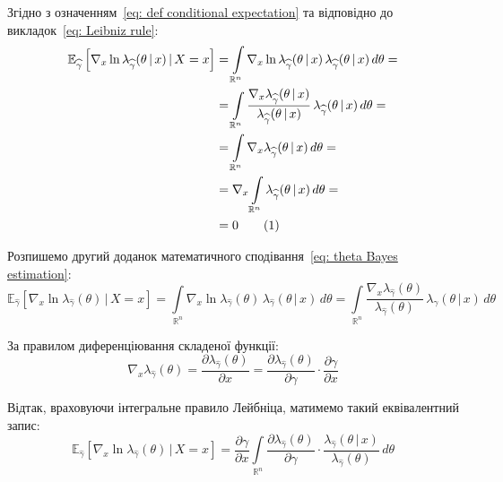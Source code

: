 \documentclass{mathreport}
\begin{document}
Згідно з означенням~\eqref{eq: def conditional expectation} та відповідно до викладок~\eqref{eq: Leibniz rule}:
\begin{align*}\label{eq: duplicated Leibniz rule}
    \mathbb{E}_{\widehat{\gamma}} \left[ \nabla_x\ln{\lambda_{\widehat{\gamma}}(\theta \,|\, x)} \,|\, X=x \right] & = \int\limits_{\mathbb{R}^n} \nabla_x\ln{\lambda_{\widehat{\gamma}}(\theta \,|\, x)} \, \lambda_{\widehat{\gamma}}(\theta \,|\, x) \, d\theta = \\
    & = \int\limits_{\mathbb{R}^n} \frac{\nabla_x\lambda_{\widehat{\gamma}}(\theta \,|\, x)}{\lambda_{\widehat{\gamma}}(\theta \,|\, x)} \, \lambda_{\widehat{\gamma}}(\theta \,|\, x) \, d\theta = \\
    & = \int\limits_{\mathbb{R}^n} \nabla_x\lambda_{\widehat{\gamma}}(\theta \,|\, x) \, d\theta = \\
    & = \nabla_x \int\limits_{\mathbb{R}^n} \lambda_{\widehat{\gamma}}(\theta \,|\, x) \, d\theta = \\
    & = 0 \stepcounter{equation}\tag{\theequation}
\end{align*}

Розпишемо другий доданок математичного сподівання~\eqref{eq: theta Bayes estimation}:
\begin{equation}
    \mathbb{E}_{\widehat{\gamma}} \left[ \nabla_x\ln{\lambda_{\widehat{\gamma}}(\theta)} \,|\, X=x \right] = \int\limits_{\mathbb{R}^n} \nabla_x\ln{\lambda_{\widehat{\gamma}}(\theta)} \, \lambda_{\widehat{\gamma}}(\theta \,|\, x) \, d\theta = \int\limits_{\mathbb{R}^n} \frac{\nabla_x\lambda_{\widehat{\gamma}}(\theta)}{\lambda_{\widehat{\gamma}}(\theta)} \, \lambda_{\widehat{\gamma}}(\theta \,|\, x) \, d\theta
\end{equation}

За правилом диференціювання складеної функції:
\begin{equation}\label{eq: chain rule}
    \nabla_x\lambda_{\widehat{\gamma}}(\theta) = \frac{\partial \lambda_{\widehat{\gamma}}(\theta)}{\partial x} = \frac{\partial \lambda_{\widehat{\gamma}}(\theta)}{\partial \gamma} \cdot \frac{\partial \gamma}{\partial x}
\end{equation}

Відтак, враховуючи інтегральне правило Лейбніца, матимемо такий еквівалентний запис:
\begin{equation}\label{eq: prior expectation}
    \mathbb{E}_{\widehat{\gamma}} \left[ \nabla_x\ln{\lambda_{\widehat{\gamma}}(\theta)} \,|\, X=x \right] = \frac{\partial \gamma}{\partial x} \int\limits_{\mathbb{R}^n} \frac{\partial \lambda_{\widehat{\gamma}}(\theta)}{\partial \gamma} \cdot \frac{\lambda_{\widehat{\gamma}}(\theta \,|\, x)}{\lambda_{\widehat{\gamma}}(\theta)} \, d\theta
\end{equation}
\end{document}
